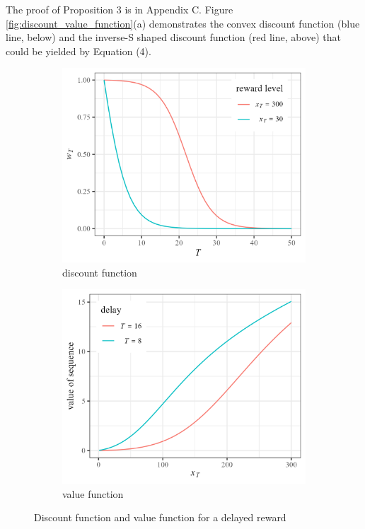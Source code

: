 \documentclass[
  12pt,
]{article}
\begin{document}
The proof of Proposition 3 is in Appendix C. Figure
\ref{fig:discount_value_function}(a) demonstrates the convex discount
function (blue line, below) and the inverse-S shaped discount function
(red line, above) that could be yielded by Equation (4).

\begin{figure}[h]
    \centering
    \begin{subfigure}{0.49\textwidth}
        \centering
        \includegraphics[width=\linewidth]{figures/concave_discount.png} 
        \caption{discount function}
    \end{subfigure}
    \hfill
    \begin{subfigure}{0.49\textwidth}
        \centering
        \includegraphics[width=\linewidth]{figures/s_shape_value.png}
        \caption{value function}
    \end{subfigure}
    \caption{Discount function and value function for a delayed reward}


\end{figure}
\end{document}
